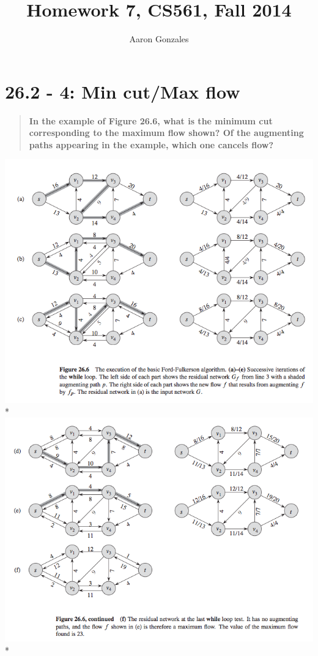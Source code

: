 \documentclass[titlepage]{article}\usepackage[]{graphicx}\usepackage[]{color}
\begin{document}
\title{Homework 7, CS561, Fall 2014}
\author{Aaron Gonzales}


\section{26.2 - 4: Min cut/Max flow}
  \begin{quote}
    \textbf{In the example of Figure 26.6, what is the minimum cut corresponding
    to the maximum flow shown? Of the augmenting paths appearing in the
    example, which one cancels flow?}
  \end{quote}

  \includegraphics[scale=0.40]{26.6a.png}\\*
  \includegraphics[scale=0.40]{26.6b.png}\\*
\end{document}
